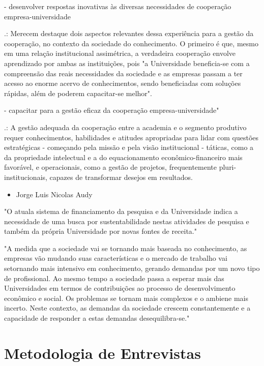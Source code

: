 - desenvolver respostas inovativas às diversas necessidades de cooperação empresa-universidade

.: Merecem destaque dois aspectos relevantes dessa experiência para a gestão da cooperação, no contexto da sociedade do conhecimento. O primeiro é que, mesmo em uma relação institucional assimétrica, a verdadeira cooperação envolve aprendizado por ambas as instituições, pois "a Universidade beneficia-se com a compreensão das reais necessidades da sociedade e as empresas passam a ter acesso ao enorme acervo de conhecimentos, sendo beneficiadas com soluções rápidas, além de poderem capacitar-se melhor". 

- capacitar para a gestão eficaz da cooperação empresa-universidade"

.: A gestão adequada da cooperação entre a academia e o segmento produtivo requer conhecimentos, habilidades e atitudes apropriadas para lidar com questões estratégicas - começando pela missão e pela visão institucional - táticas, como a da propriedade intelectual e a do equacionamento econômico-financeiro mais favorável, e operacionais, como a gestão de projetos, frequentemente pluri-institucionais, capazes de transformar desejos em resultados. 

\begin{itemize}
\item Jorge Luis Nicolas Audy
\end{itemize}

"O atuala sistema de financiamento da pesquisa e da Universidade indica a necessidade de uma busca por sustentabilidade nestas atividades de pesquisa e também da própria Universidade por novas fontes de receita."

"A medida que a sociedade vai se tornando mais baseada no conhecimento, as empresas vão mudando suas características e o mercado de trabalho vai setornando mais intensivo em conhecimento, gerando demandas por um novo tipo de profissional. Ao mesmo tempo a sociedade passa a esperar mais das Universidades em termos de contribuições ao processo de desenvolvimento econômico e social. Os problemas se tornam mais complexos e o ambiene mais incerto. Neste contexto, as demandas da sociedade crescem constantemente e a capacidade de responder a estas demandas desequilibra-se."

\section{Metodologia de Entrevistas}
\label{cha:ensino}
